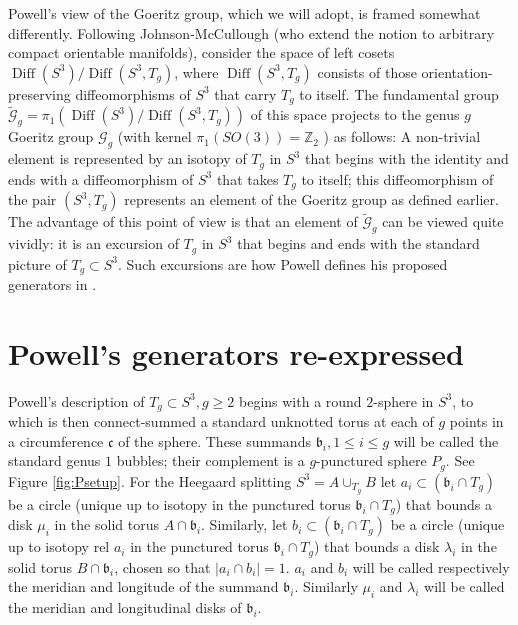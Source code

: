 \documentclass[12pt]{amsart}
\newcommand{\calG}{\mathcal G}
\newcommand{\Diff}{\operatorname{Diff}}
\newcommand{\frb}{\mathfrak{b}}
\newcommand{\frc}{\mbox{$\mathfrak{c}$}}
\begin{document}
Powell's view of the Goeritz group, which we will adopt, is framed somewhat differently.  Following Johnson-McCullough \cite{JM} (who extend the notion to arbitrary compact orientable manifolds), consider the space of left cosets $\Diff(S^3)/\Diff(S^3, T_g)$, where $\Diff(S^3, T_g)$ consists of those orientation-preserving diffeomorphisms of $S^3$ that carry $T_g$ to itself.  The fundamental group $\tilde{\calG}_g = \pi_1(\Diff(S^3)/\Diff(S^3, T_g))$
 of this space projects to the genus $g$ Goeritz group $\calG_g$ (with kernel $\pi_1(SO(3)) = \mathbb{Z}_2$ \cite[p.197]{Po}) as follows:  A non-trivial element is represented by an isotopy of $T_g$ in $S^3$ that begins with the identity and ends with a diffeomorphism of $S^3$ that takes $T_g$ to itself; this diffeomorphism of the pair $(S^3, T_g)$ represents an element of the Goeritz group as defined earlier.  The advantage of this point of view
is that an element of $\tilde{\calG}_g$ can be viewed quite vividly: it is an excursion of $T_g$ in $S^3$ that begins and ends with the standard picture of $T_g \subset S^3$.  Such excursions are how Powell defines his proposed generators in \cite[Figure 4]{Po}.  

\section{Powell's generators re-expressed}

Powell's description of $T_g \subset S^3, g \geq 2$ begins with a round $2$-sphere in $S^3$, to which is then connect-summed  a standard unknotted torus at each of $g$ points in a circumference $\frc$ of the sphere.  These summands $\frb_i, 1 \leq i \leq g$ will be called the standard genus $1$ bubbles; their complement is a $g$-punctured sphere $P_g$. See Figure \ref{fig:Psetup}. For the Heegaard splitting $S^3 = A \cup_{T_g} B$ let $a_i \subset (\frb_i \cap T_g)$ be a circle (unique up to isotopy in the punctured torus $\frb_i \cap T_g$) that bounds a disk $\mu_i$ in the solid torus $A \cap \frb_i$.  Similarly, let $b_i \subset (\frb_i \cap T_g)$ be a circle (unique up to isotopy rel $a_i$ in the punctured torus $\frb_i \cap T_g$)  that bounds a disk $\lambda_i$ in the solid torus $B \cap \frb_i$, chosen so that $|a_i \cap b_i| = 1$.  $a_i$ and $b_i$ will be called respectively the meridian and longitude of the summand $\frb_i$.  Similarly $\mu_i$ and $\lambda_i$ will be called the meridian and longitudinal disks of $\frb_i$.  
\end{document}
